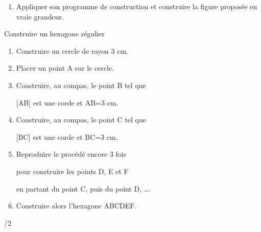 \documentclass[a4paper]{book}
\begin{document}
{\begin{exercice}
\begin{enumerate}
\begin{enumerate}
                \item \points[30]

                \medskip

                \item \points[30]
            \end{enumerate}

            \item Appliquer son programme de construction et construire la figure proposée en vraie grandeur.

            \vspace{9cm}
        \end{enumerate}
    \end{exercice}


    \begin{exerciceTitre}{Construire un hexagone régulier}
        \begin{enumerate}
            \item Construire un cercle de rayon 3 cm.
            
            \item Placer un point A sur le cercle.
            
            \item Construire, au compas, le point B tel que 
            
            [AB] est une corde et AB=3 cm.
            
            \item Construire, au compas, le point C tel que 
            
            [BC] est une corde et BC=3 cm.
            
            \item Reproduire le procédé encore 3 fois 
            
            pour construire les points D, E et F 
            
            en partant du point C, puis du point D, \ldots.
            
            \item Construire alors l'hexagone ABCDEF.
        \end{enumerate}  
    \end{exerciceTitre}


\vfill
\thepage/2 \hfill \text{ }
}
\end{document}
